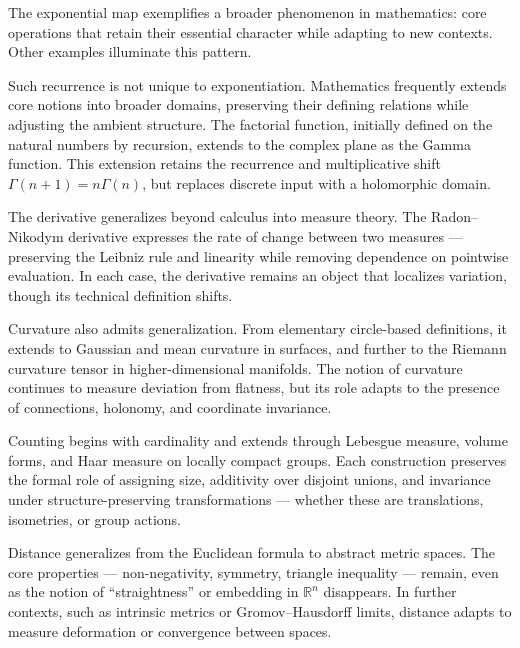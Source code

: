 \begin{commentary}[Generalizations]
The exponential map exemplifies a broader phenomenon in mathematics: core operations that retain their essential character while adapting to new contexts. Other examples illuminate this pattern.

Such recurrence is not unique to exponentiation. Mathematics frequently extends core notions into broader domains, preserving their defining relations while adjusting the ambient structure. The factorial function, initially defined on the natural numbers by recursion, extends to the complex plane as the Gamma function. This extension retains the recurrence and multiplicative shift \( \Gamma(n+1) = n\Gamma(n) \), but replaces discrete input with a holomorphic domain.

The derivative generalizes beyond calculus into measure theory. The Radon–Nikodym derivative expresses the rate of change between two measures — preserving the Leibniz rule and linearity while removing dependence on pointwise evaluation. In each case, the derivative remains an object that localizes variation, though its technical definition shifts.

Curvature also admits generalization. From elementary circle-based definitions, it extends to Gaussian and mean curvature in surfaces, and further to the Riemann curvature tensor in higher-dimensional manifolds. The notion of curvature continues to measure deviation from flatness, but its role adapts to the presence of connections, holonomy, and coordinate invariance.

Counting begins with cardinality and extends through Lebesgue measure, volume forms, and Haar measure on locally compact groups. Each construction preserves the formal role of assigning size, additivity over disjoint unions, and invariance under structure-preserving transformations — whether these are translations, isometries, or group actions.

Distance generalizes from the Euclidean formula to abstract metric spaces. The core properties — non-negativity, symmetry, triangle inequality — remain, even as the notion of “straightness” or embedding in $\mathbb{R}^n$ disappears. In further contexts, such as intrinsic metrics or Gromov–Hausdorff limits, distance adapts to measure deformation or convergence between spaces.

\end{commentary}
